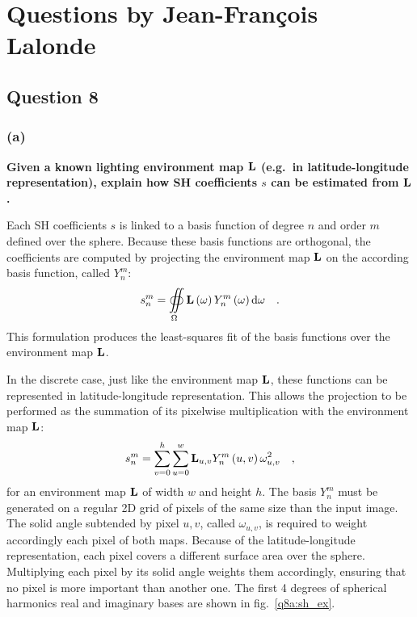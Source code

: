 \documentclass{report}
\begin{document}
\chapter{Questions by Jean-François Lalonde}

\section{Question 8}
\subsection{(a)}
\textbf{Given a known lighting environment map $\mathbf{L}$ (e.g.\ in latitude-longitude representation), explain how SH coefficients $s$ can be estimated from $\mathbf{L}$.}

Each SH coefficients $s$ is linked to a basis function of degree $n$ and order $m$ defined over the sphere. Because these basis functions are orthogonal, the coefficients are computed by projecting the environment map $\mathbf{L}$ on the according basis function, called $Y_n^m$:
\begin{equation}
s_n^m = \oiint\limits_{\Omega} \mathbf{L}\left(\mathbf{\omega} \right) Y_n^m \left( \mathbf{\omega} \right) \mathrm{d} \mathbf{\omega}   \quad.
\end{equation}
This formulation produces the least-squares fit of the basis functions over the environment map $\mathbf{L}$.

In the discrete case, just like the environment map $\mathbf{L}$, these functions can be represented in latitude-longitude representation. This allows the projection to be performed as the summation of its pixelwise multiplication with the environment map $\mathbf{L}$:
\begin{equation}
s_n^m = \sum_{v=0}^{h} \sum_{u=0}^{w} \mathbf{L}_{u,v} Y_n^m\left(u, v\right) \omega_{u,v}^2 \quad,
\end{equation}
for an environment map $\mathbf{L}$ of width $w$ and height $h$. The basis $Y_n^m$ must be generated on a regular 2D grid of pixels of the same size than the input image. The solid angle subtended by pixel $u,v$, called $\omega_{u,v}$, is required to weight accordingly each pixel of both maps. Because of the latitude-longitude representation, each pixel covers a different surface area over the sphere. Multiplying each pixel by its solid angle weights them accordingly, ensuring that no pixel is more important than another one. The first 4 degrees of spherical harmonics real and imaginary bases are shown in fig.~\ref{q8a:sh_ex}.
\end{document}
